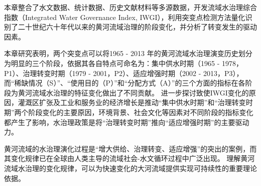 本章整合了水文数据、统计数据、历史文献材料等多源数据，开发流域水治理综合指数（Integrated Water Governance Index, IWGI），利用突变点检测方法量化识别了二十世纪六十年代以来的黄河流域治理的阶段变化，并分析了转变发生的驱动因素。

本章研究表明，两个突变点可以将1965 - 2013 年的黄河流域水治理演变历史划分为明显的三个阶段，依据其各自特点可命名为：集中供水时期（1965 - 1978，P1）、治理转变时期（1979 - 2001，P2）、适应增强时期（2002 - 2013，P3），而“稀缺情况（S）”、“使用目的（P）”和“分配方式（A）”的三个方面的指标在各阶段为黄河流域水治理的特征变化做出了不同贡献。
进一步探讨致使IWGI变化的原因，灌溉区扩张及工业和服务业的经济增长是推动“集中供水时期”和“治理转变时期”两个阶段变化的主要原因，环境背景、社会文化等因素对不同阶段的指标变化都产生了影响，水治理政策是将“治理转变时期”推向“适应增强时期”的主要驱动力。

黄河流域的水治理演化过程是“增大供给、治理转变、适应增强”的突出的案例，而其变化规律已在全球由人类主导的流域社会-水文循环过程中广泛出现。
理解黄河流域水治理的变化规律，可以为快速变化的大河流域提供实现可持续性的重要理论依据。
